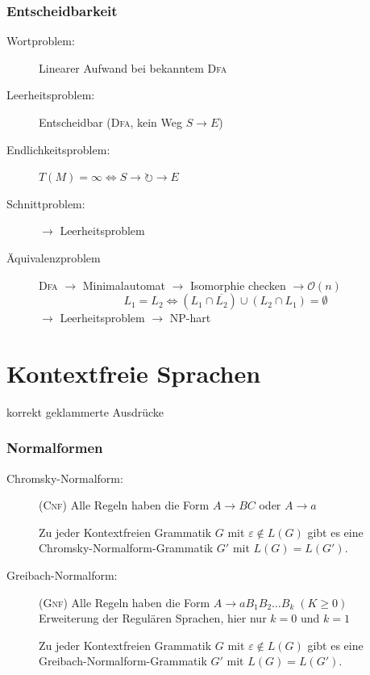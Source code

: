\documentclass{scrartcl}
\begin{document}
\subsubsection*{Entscheidbarkeit}
\begin{description}
    \item[Wortproblem:] Linearer Aufwand bei bekanntem \textsc{Dfa}
    \item[Leerheitsproblem:] Entscheidbar (\textsc{Dfa}, kein Weg $S\to E$)
    \item[Endlichkeitsproblem:] $T(M) = \infty \Leftrightarrow S\to\circlearrowright\to E$
    \item[Schnittproblem:] $\to$ Leerheitsproblem
    \item[Äquivalenzproblem] \textsc{Dfa} $\to$ Minimalautomat $\to$ Isomorphie checken $\to \mathcal{O}(n)$
    \[ L_1 = L_2 \Leftrightarrow \left(L_1 \cap \overline{L_2}\right) \cup \left(L_2 \cap L_1\right) = \emptyset \]
    $\to$ Leerheitsproblem $\to$ NP-hart
\end{description}

\section*{Kontextfreie Sprachen}
{\tiny korrekt geklammerte Ausdrücke}
\subsubsection*{Normalformen}
\begin{description}
    \item[Chromsky-Normalform:] (\textsc{Cnf}) Alle Regeln haben die Form $A\to BC$ oder $A\to a$
    \begin{shaded}
        Zu jeder Kontextfreien Grammatik $G$ mit $\varepsilon\not\in L(G)$ gibt es eine Chromsky-Normalform-Grammatik $G'$ mit $L(G) = L(G')$.
    \end{shaded}
    \item[Greibach-Normalform:] (\textsc{Gnf}) Alle Regeln haben die Form $A\to aB_1B_2\dots B_k\; (K\geq0)$ \\ {\tiny Erweiterung der Regulären Sprachen, hier nur $k=0$ und $k=1$}
    \begin{shaded}
        Zu jeder Kontextfreien Grammatik $G$ mit $\varepsilon\not\in L(G)$ gibt es eine Greibach-Normalform-Grammatik $G'$ mit $L(G) = L(G')$.
    \end{shaded}
\end{description}
\end{document}
